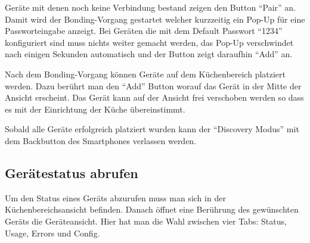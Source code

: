 Geräte mit denen noch keine Verbindung bestand zeigen den Button \enquote{Pair} an. Damit wird der Bonding-Vorgang gestartet welcher kurzzeitig ein Pop-Up für eine Passworteingabe anzeigt. Bei Geräten die mit dem Default Passwort \enquote{1234} konfiguriert sind muss nichts weiter gemacht werden, das Pop-Up verschwindet nach einigen Sekunden automatisch und der Button zeigt daraufhin \enquote{Add} an.

Nach dem Bonding-Vorgang können Geräte auf dem Küchenbereich platziert werden. Dazu berührt man den \enquote{Add} Button worauf das Gerät in der Mitte der Ansicht erscheint. Das Gerät kann auf der Ansicht frei verschoben werden so dass es mit der Einrichtung der Küche übereinstimmt. 

Sobald alle Geräte erfolgreich platziert wurden kann der \enquote{Discovery Modus} mit dem Backbutton des Smartphones verlassen werden.

\WFclear
\subsection{Gerätestatus abrufen}
Um den Status eines Geräts abzurufen muss man sich in der Küchenbereichsansicht befinden. Danach öffnet eine Berührung des gewünschten Geräts die Geräteansicht. Hier hat man die Wahl zwischen vier Tabs: Status, Usage, Errors und Config.


